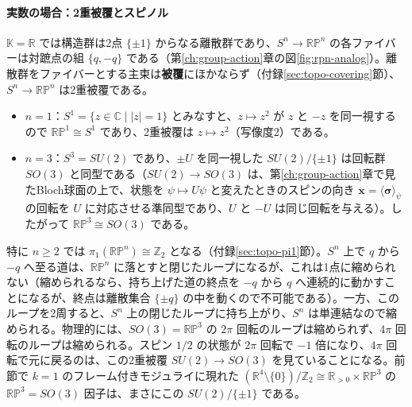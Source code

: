 \documentclass[uplatex, dvipdfmx, book]{jsbook}
\begin{document}
\paragraph{実数の場合：2重被覆とスピノル}
$\mathbb{K} = \mathbb{R}$ では構造群は2点 $\{\pm 1\}$ からなる離散群であり、$S^n \to \mathbb{RP}^n$ の各ファイバーは対蹠点の組 $\{q, -q\}$ である（第\ref{ch:group-action}章の図\ref{fig:rpn-analog}）。離散群をファイバーとする主束は\textbf{被覆}にほかならず（付録\ref{sec:topo-covering}節）、$S^n \to \mathbb{RP}^n$ は2重被覆である。
\begin{itemize}
    \item $n = 1$：$S^1 = \{z \in \mathbb{C} \mid |z| = 1\}$ とみなすと、$z \mapsto z^2$ が $z$ と $-z$ を同一視するので $\mathbb{RP}^1 \cong S^1$ であり、2重被覆は $z \mapsto z^2$（写像度2）である。
    \item $n = 3$：$S^3 = SU(2)$ であり、$\pm U$ を同一視した $SU(2)/\{\pm 1\}$ は回転群 $SO(3)$ と同型である（$SU(2) \to SO(3)$ は、第\ref{ch:group-action}章で見たBloch球面の上で、状態を $\psi \mapsto U\psi$ と変えたときのスピンの向き $\bm{x} = \langle \bm{\sigma} \rangle_\psi$ の回転を $U$ に対応させる準同型であり、$U$ と $-U$ は同じ回転を与える）。したがって $\mathbb{RP}^3 \cong SO(3)$ である。
\end{itemize}
特に $n \ge 2$ では $\pi_1(\mathbb{RP}^n) \cong \mathbb{Z}_2$ となる（付録\ref{sec:topo-pi1}節）。$S^n$ 上で $q$ から $-q$ へ至る道は、$\mathbb{RP}^n$ に落とすと閉じたループになるが、これは1点に縮められない（縮められるなら、持ち上げた道の終点を $-q$ から $q$ へ連続的に動かすことになるが、終点は離散集合 $\{\pm q\}$ の中を動くので不可能である）。一方、このループを2周すると、$S^n$ 上の閉じたループに持ち上がり、$S^n$ は単連結なので縮められる。物理的には、$SO(3) = \mathbb{RP}^3$ の $2\pi$ 回転のループは縮められず、$4\pi$ 回転のループは縮められる。スピン $1/2$ の状態が $2\pi$ 回転で $-1$ 倍になり、$4\pi$ 回転で元に戻るのは、この2重被覆 $SU(2) \to SO(3)$ を見ていることになる。前節で $k = 1$ のフレーム付きモジュライに現れた $(\mathbb{R}^4 \setminus \{0\})/\mathbb{Z}_2 \cong \mathbb{R}_{>0} \times \mathbb{RP}^3$ の $\mathbb{RP}^3 = SO(3)$ 因子は、まさにこの $SU(2)/\{\pm 1\}$ である。
\end{document}
